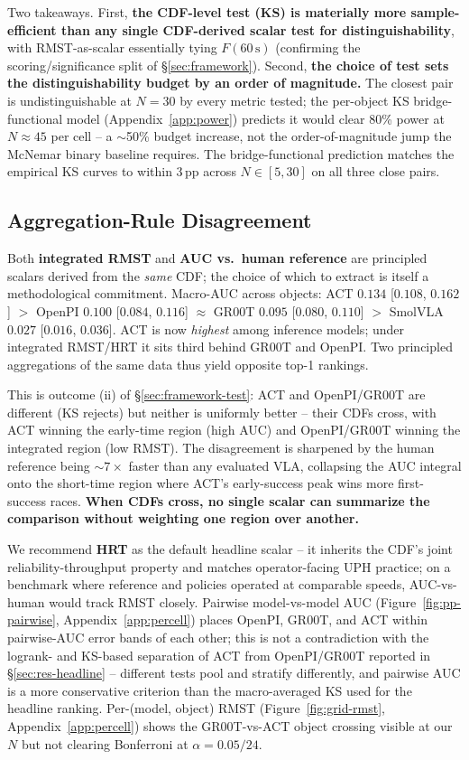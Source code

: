 \documentclass{article}
\begin{document}
Two takeaways. First, \textbf{the CDF-level test (KS) is materially more sample-efficient than any single CDF-derived scalar test for distinguishability}, with RMST-as-scalar essentially tying $F(60\,\text{s})$ (confirming the scoring/significance split of \S\ref{sec:framework}). Second, \textbf{the choice of test sets the distinguishability budget by an order of magnitude.} The closest pair is undistinguishable at $N{=}30$ by every metric tested; the per-object KS bridge-functional model (Appendix~\ref{app:power}) predicts it would clear 80\% power at $N \approx 45$ per cell -- a $\sim$50\% budget increase, not the order-of-magnitude jump the McNemar binary baseline requires. The bridge-functional prediction matches the empirical KS curves to within 3\,pp across $N \in [5, 30]$ on all three close pairs.

\subsection{Aggregation-Rule Disagreement}\label{sec:res-aggregation}

Both \textbf{integrated RMST} and \textbf{AUC vs.\ human reference} are principled scalars derived from the \emph{same} CDF; the choice of which to extract is itself a methodological commitment. Macro-AUC across objects: ACT $0.134$ [$0.108$, $0.162$] $>$ OpenPI $0.100$ [$0.084$, $0.116$] $\approx$ GR00T $0.095$ [$0.080$, $0.110$] $>$ SmolVLA $0.027$ [$0.016$, $0.036$]. ACT is now \emph{highest} among inference models; under integrated RMST/HRT it sits third behind GR00T and OpenPI. Two principled aggregations of the same data thus yield opposite top-1 rankings.

This is outcome (ii) of \S\ref{sec:framework-test}: ACT and OpenPI/GR00T are different (KS rejects) but neither is uniformly better -- their CDFs cross, with ACT winning the early-time region (high AUC) and OpenPI/GR00T winning the integrated region (low RMST). The disagreement is sharpened by the human reference being ${\sim}7\times$ faster than any evaluated VLA, collapsing the AUC integral onto the short-time region where ACT's early-success peak wins more first-success races. \textbf{When CDFs cross, no single scalar can summarize the comparison without weighting one region over another.}

We recommend \textbf{HRT} as the default headline scalar -- it inherits the CDF's joint reliability-throughput property and matches operator-facing UPH practice; on a benchmark where reference and policies operated at comparable speeds, AUC-vs-human would track RMST closely. Pairwise model-vs-model AUC (Figure~\ref{fig:pp-pairwise}, Appendix~\ref{app:percell}) places OpenPI, GR00T, and ACT within pairwise-AUC error bands of each other; this is not a contradiction with the logrank- and KS-based separation of ACT from OpenPI/GR00T reported in \S\ref{sec:res-headline} -- different tests pool and stratify differently, and pairwise AUC is a more conservative criterion than the macro-averaged KS used for the headline ranking. Per-(model, object) RMST (Figure~\ref{fig:grid-rmst}, Appendix~\ref{app:percell}) shows the GR00T-vs-ACT object crossing visible at our $N$ but not clearing Bonferroni at $\alpha = 0.05/24$.
\end{document}
